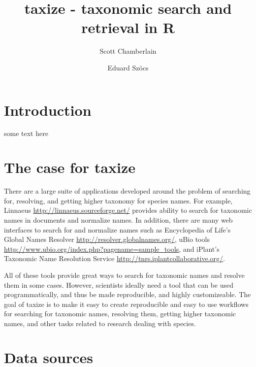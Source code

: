 \documentclass[letterpaper,superscriptaddress,showkeys,longbibliography]{revtex4-1}\usepackage{graphicx, color}
\begin{document}




\title{taxize - taxonomic search and retrieval in R}

\author{Scott Chamberlain}

\author{Eduard Sz\"{o}cs}

\maketitle

\section{Introduction}

some text here

\section{The case for taxize}

There are a large suite of applications developed around the problem of searching for, resolving, and getting higher taxonomy for species names. For example, Linnaeus \url{http://linnaeus.sourceforge.net/} provides ability to search for taxonomic names in documents and normalize names. In addition, there are many web interfaces to search for and normalize names such as Encyclopedia of Life's Global Names Resolver \url{http://resolver.globalnames.org/}, uBio tools \url{http://www.ubio.org/index.php?pagename=sample_tools}, and iPlant's Taxonomic Name Resolution Service \url{http://tnrs.iplantcollaborative.org/}. 

All of these tools provide great ways to search for taxonomic names and resolve them in some cases. However, scientists ideally need a tool that can be used programmatically, and thus be made reproducible, and highly customizeable. The goal of taxize is to make it easy to create reproducible and easy to use workflows for searching for taxonomic names, resolving them, getting higher taxonomic names, and other tasks related to research dealing with species. 

\section{Data sources}
\end{document}
